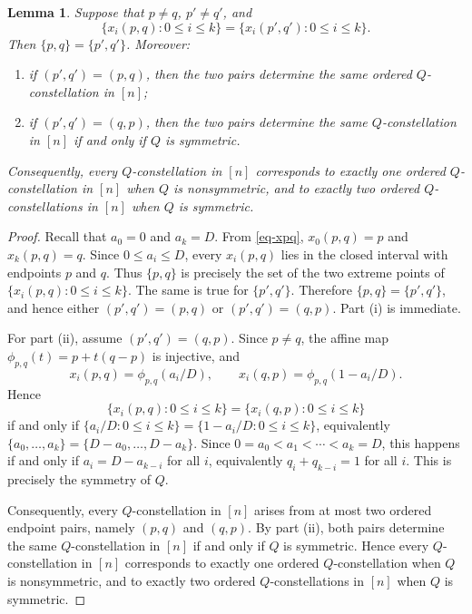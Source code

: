 \documentclass[twoside,12pt]{article}
\newcommand{\1}{\mathbf 1}
\newtheorem{lemma}{Lemma}[section]
\begin{document}
\begin{lemma}\label{lem:actual-ordered}
Suppose that \(p\ne q\), \(p'\ne q'\), and
\[
\{x_i(p,q):0\le i\le k\}=\{x_i(p',q'):0\le i\le k\}.
\]
Then \(\{p,q\}=\{p',q'\}\).  Moreover:
\begin{enumerate}[label=\textnormal{(\roman*)}]
\item if \((p',q')=(p,q)\), then the two pairs determine the same ordered
\(Q\)-constellation in \([n]\);
\item if \((p',q')=(q,p)\), then the two pairs determine the same
\(Q\)-constellation in \([n]\) if and only if \(Q\) is symmetric.
\end{enumerate}
Consequently, every \(Q\)-constellation in \([n]\) corresponds to exactly one
ordered \(Q\)-constellation in \([n]\) when \(Q\) is nonsymmetric, and to
exactly two ordered \(Q\)-constellations in \([n]\) when \(Q\) is symmetric.
\end{lemma}

\begin{proof}
Recall that \(a_0=0\) and \(a_k=D\).  From \eqref{eq-xpq},
\(x_0(p,q)=p\) and \(x_k(p,q)=q\).  Since \(0\le a_i\le D\), every
\(x_i(p,q)\) lies in the closed interval with endpoints \(p\) and \(q\).  Thus
\(\{p,q\}\) is precisely the set of the two extreme points of
\(\{x_i(p,q):0\le i\le k\}\).  The same is true for \(\{p',q'\}\).  Therefore
\(\{p,q\}=\{p',q'\}\), and hence either \((p',q')=(p,q)\) or
\((p',q')=(q,p)\).  Part \textnormal{(i)} is immediate.

For part \textnormal{(ii)}, assume \((p',q')=(q,p)\).  Since \(p\ne q\), the
affine map \(\phi_{p,q}(t)=p+t(q-p)\) is injective, and
\[
x_i(p,q)=\phi_{p,q}(a_i/D),
\qquad
x_i(q,p)=\phi_{p,q}(1-a_i/D).
\]
Hence
\[
\{x_i(p,q):0\le i\le k\}=\{x_i(q,p):0\le i\le k\}
\]
if and only if
\(\{a_i/D:0\le i\le k\}=\{1-a_i/D:0\le i\le k\}\), equivalently
\(\{a_0,\dots,a_k\}=\{D-a_0,\dots,D-a_k\}\).  Since
\(0=a_0<a_1<\cdots<a_k=D\), this happens if and only if
\(a_i=D-a_{k-i}\) for all \(i\), equivalently \(q_i+q_{k-i}=1\) for all
\(i\).  This is precisely the symmetry of \(Q\).

Consequently, every \(Q\)-constellation in \([n]\) arises from at most two ordered endpoint pairs, namely \((p,q)\) and \((q,p)\). By part \textnormal{(ii)}, both pairs determine the same \(Q\)-constellation in \([n]\) if and only if \(Q\) is symmetric. Hence every \(Q\)-constellation in \([n]\) corresponds to exactly one ordered \(Q\)-constellation when \(Q\) is nonsymmetric, and to exactly two ordered \(Q\)-constellations in \([n]\) when \(Q\) is symmetric.
\end{proof}
\end{document}
